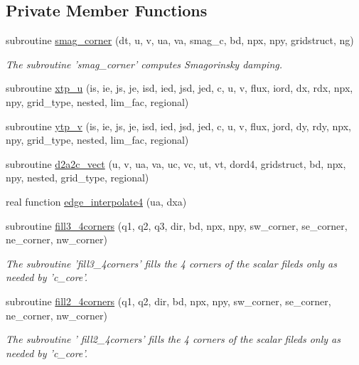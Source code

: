 \subsection*{Private Member Functions}
\begin{DoxyCompactItemize}
\item 
subroutine \hyperlink{classsw__core__mod_a6e132ed43cea34af8a1a5388f953e94f}{smag\-\_\-corner} (dt, u, v, ua, va, smag\-\_\-c, bd, npx, npy, gridstruct, ng)
\begin{DoxyCompactList}\small\item\em The subroutine 'smag\-\_\-corner' computes Smagorinsky damping. \end{DoxyCompactList}\item 
subroutine \hyperlink{classsw__core__mod_a2b9d2b9cf39bd4642bddbb8af486c58e}{xtp\-\_\-u} (is, ie, js, je, isd, ied, jsd, jed, c, u, v, flux, iord, dx, rdx, npx, npy, grid\-\_\-type, nested, lim\-\_\-fac, regional)
\item 
subroutine \hyperlink{classsw__core__mod_af7c398917a27a6b38f09f5ef39c13cf7}{ytp\-\_\-v} (is, ie, js, je, isd, ied, jsd, jed, c, u, v, flux, jord, dy, rdy, npx, npy, grid\-\_\-type, nested, lim\-\_\-fac, regional)
\item 
subroutine \hyperlink{classsw__core__mod_a5dd013d734ca6e66eb060eb69ab52e66}{d2a2c\-\_\-vect} (u, v, ua, va, uc, vc, ut, vt, dord4, gridstruct, bd, npx, npy, nested, grid\-\_\-type, regional)
\item 
real function \hyperlink{classsw__core__mod_afc530a76cd1e1a41ef3a050038d8920d}{edge\-\_\-interpolate4} (ua, dxa)
\item 
subroutine \hyperlink{classsw__core__mod_a246243fbfb969bc99cc9656b5ef9d773}{fill3\-\_\-4corners} (q1, q2, q3, dir, bd, npx, npy, sw\-\_\-corner, se\-\_\-corner, ne\-\_\-corner, nw\-\_\-corner)
\begin{DoxyCompactList}\small\item\em The subroutine 'fill3\-\_\-4corners' fills the 4 corners of the scalar fileds only as needed by 'c\-\_\-core'. \end{DoxyCompactList}\item 
subroutine \hyperlink{classsw__core__mod_a5833b05bf829b877a0a42472cc037a44}{fill2\-\_\-4corners} (q1, q2, dir, bd, npx, npy, sw\-\_\-corner, se\-\_\-corner, ne\-\_\-corner, nw\-\_\-corner)
\begin{DoxyCompactList}\small\item\em The subroutine ' fill2\-\_\-4corners' fills the 4 corners of the scalar fileds only as needed by 'c\-\_\-core'. \end{DoxyCompactList}\end{DoxyCompactItemize}



